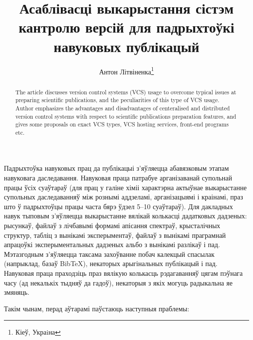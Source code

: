 \documentclass[10pt, a5paper]{article}
\begin{document}
\title{Асаблівасці выкарыстання сістэм кантролю версій для падрыхтоўкі навуковых публікацый}%

\author{Антон Літвіненка\footnote{Кіеў, Украiна}}
\maketitle

\begin{abstract}
The article discusses version control systems (VCS) usage to overcome typical issues at preparing scientific publications, and the peculiarities of this type of VCS usage. Author emphasizes the advantages and disadvantages of centeralised and distributed version control systems with respect to scientific publications \linebreak preparation features, and gives some proposals on exact VCS types, VCS hosting services, front-end programs etc.
\end{abstract}

Падрыхтоўка навуковых прац да публікацыі з'яўляецца абавязковым этапам навуковага даследавання. Навуковая праца патрабуе арганізаванай супольнай працы ўсіх суаўтараў (для прац у галіне хіміі характэрна актыўнае выкарыстанне супольных даследаванняў між рознымі аддзеламі, арганізацыямі і краінамі, праз што ў падрыхтоўцы працы часта бярэ ўдзел 5--10 суаўтараў). Для дакладных навук тыповым з'яўляецца выкарыстанне вялікай колькасці дадатковых дадзеных: рысункаў, файлаў з лічбавымі формамі апісання спектраў, крысталічных структур, табліц з вынікамі эксперыментаў, файлаў з вынікамі праграмнай апрацоўкі эксперыментальных дадзеных альбо з вынікамі разлікаў і пад. Мэтазгодным з'яўляецца таксама захоўванне побач калекцый спасылак (напрыклад, базаў BibTeX), некаторых арыгінальных публікацый і пад. Навуковая праца праходзіць праз вялікую колькасць рэдагаванняў цягам пэўнага часу (ад некалькіх тыдняў да гадоў), некаторыя з якіх могуць радыкальна яе змяняць.

Такім чынам, перад аўтарамі паўстаюць наступныя праблемы:
\end{document}

